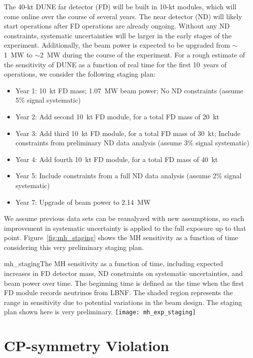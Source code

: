 The 40-kt DUNE far detector (FD) will be built in 10-kt modules, which will come online over the course of several years.  The near detector (ND) will likely start operations after FD operations are already ongoing.  Without any ND constraints, systematic uncertainties will be larger in the early stages of the experiment. Additionally, the beam power is expected to be upgraded from $\sim$1~MW to $\sim$2~MW during the course of the experiment. For a rough estimate of the sensitivity of DUNE as a function of real time for the first 10~years of operations, we consider the following staging plan:
\begin{itemize}
 \item Year 1: 10~kt FD mass; 1.07~MW beam power; No ND constraints (assume 5\% signal systematic)
 \item Year 2: Add second 10~kt FD module, for a total FD mass of 20~kt
 \item Year 3: Add third 10~kt FD module, for a total FD mass of 30~kt; Include constraints from preliminary ND data analysis (assume 3\% signal systematic)
 \item Year 4: Add fourth 10~kt FD module, for a total FD mass of 40~kt
 \item Year 5: Include constraints from a full ND data analysis (assume 2\% signal systematic)
 \item Year 7: Upgrade of beam power to 2.14~MW
\end{itemize}
We assume previous data sets can be reanalyzed with new assumptions, so each improvement in systematic uncertainty is applied to the full exposure up to that point.  Figure~\ref{fig:mh_staging} shows the MH sensitivity as a function of time considering this very preliminary staging plan.

\begin{cdrfigure}{mh_staging}{The MH sensitivity as a function of time, including expected increases in FD detector mass, ND constraints on systematic uncertainties, and beam power over time.  The beginning time is defined as the time when the first FD module records neutrinos from LBNF.  The shaded region represents the range in sensitivity due to potential variations in the beam design.  The staging plan shown here is very preliminary.}
 \texttt{[image: mh\_exp\_staging]}
\end{cdrfigure}


\section{CP-symmetry Violation}
\label{sec:physics-lbnosc-cpv}

